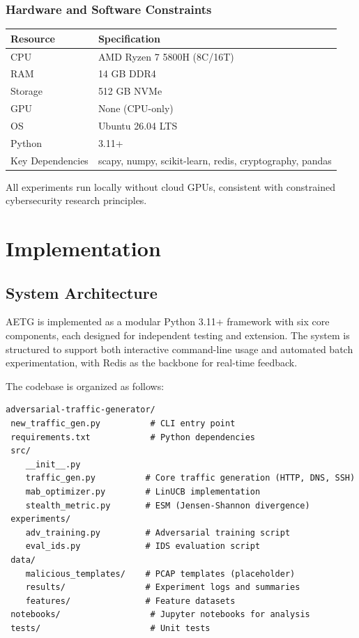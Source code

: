 \documentclass[review]{elsarticle}
\begin{document}
\subsubsection{Hardware and Software Constraints}
\begin{table}[htbp]
\small
\centering
\renewcommand{\arraystretch}{1.2}
\begin{tabular}{|l|l|}
\hline
\textbf{Resource} & \textbf{Specification} \\
\hline
CPU & AMD Ryzen 7 5800H (8C/16T) \\
RAM & 14 GB DDR4 \\
Storage & 512 GB NVMe \\
GPU & None (CPU-only) \\
OS & Ubuntu 26.04 LTS \\
Python & 3.11+ \\
Key Dependencies & scapy, numpy, scikit-learn, redis, cryptography, pandas \\
\hline
\end{tabular}
\end{table}
All experiments run locally without cloud GPUs, consistent with constrained cybersecurity research principles.

\section{Implementation}
\label{sec:implementation}

\subsection{System Architecture}
AETG is implemented as a modular Python 3.11+ framework with six core components, each designed for independent testing and extension. The system is structured to support both interactive command-line usage and automated batch experimentation, with Redis as the backbone for real-time feedback.

The codebase is organized as follows:
\begin{lstlisting}
adversarial-traffic-generator/
 new_traffic_gen.py          # CLI entry point
 requirements.txt            # Python dependencies
 src/
    __init__.py
    traffic_gen.py          # Core traffic generation (HTTP, DNS, SSH)
    mab_optimizer.py        # LinUCB implementation
    stealth_metric.py       # ESM (Jensen-Shannon divergence)
 experiments/
    adv_training.py         # Adversarial training script
    eval_ids.py             # IDS evaluation script
 data/
    malicious_templates/    # PCAP templates (placeholder)
    results/                # Experiment logs and summaries
    features/               # Feature datasets
 notebooks/                  # Jupyter notebooks for analysis
 tests/                      # Unit tests
\end{lstlisting}
\end{document}
